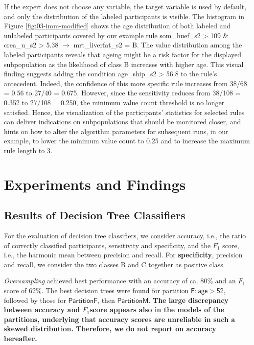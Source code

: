 \documentclass[
  oneside]{book}
\begin{document}
If the expert does not choose any variable, the target variable is used by default, and only the distribution of the labeled participants is visible.
The histogram in Figure \ref{fig:03-imm-modified} shows the age distribution of both labeled and unlabeled participants covered by our example rule som\_huef\_s2 \textgreater{} 109 \& crea\_u\_s2 \textgreater{} 5.38 \(\longrightarrow\) mrt\_liverfat\_s2 = B.
The value distribution among the labeled participants reveals that ageing might be a risk factor for the displayed subpopulation as the likelihood of class B increases with higher age.
This visual finding suggests adding the condition age\_ship\_s2 \textgreater{} 56.8 to the rule's antecedent.
Indeed, the confidence of this more specific rule increases from 38/68 = 0.56 to 27/40 = 0.675.
However, since the sensitivity reduces from 38/108 = 0.352 to 27/108 = 0.250, the minimum value count threshold is no longer satisfied.
Hence, the visualization of the participants' statistics for selected rules can deliver indications on subpopulations that should be monitored closer, and hints on how to alter the algorithm parameters for subsequent runs, in our example, to lower the minimum value count to 0.25 and to increase the maximum rule length to 3.

\hypertarget{experiments-and-findings}{%
\section{Experiments and Findings}\label{experiments-and-findings}}

\hypertarget{results-of-decision-tree-classifiers}{%
\subsection{Results of Decision Tree Classifiers}\label{results-of-decision-tree-classifiers}}

For the evaluation of decision tree classifiers, we consider accuracy, i.e., the ratio of correctly classified participants, sensitivity and specificity, and the \(F_1\) score, i.e., the harmonic mean between precision and recall.
For \textbf{specificity}, precision and recall, we consider the two classes B and C together as positive class.

\emph{Oversampling} achieved best performance with an accuracy of ca. 80\% and an \(F_1\)score of 62\%.
The best decision trees were found for partition \(\mathsf{F:age>52}\), followed by those for \(\mathsf{PartitionF}\), then \(\mathsf{PartitionM}\).
\textbf{The large discrepancy between accuracy and \(F_1\)score appears also in the models of the partitions, underlying that accuracy scores are unreliable in such a skewed distribution. Therefore, we do not report on accuracy hereafter.}
\end{document}
